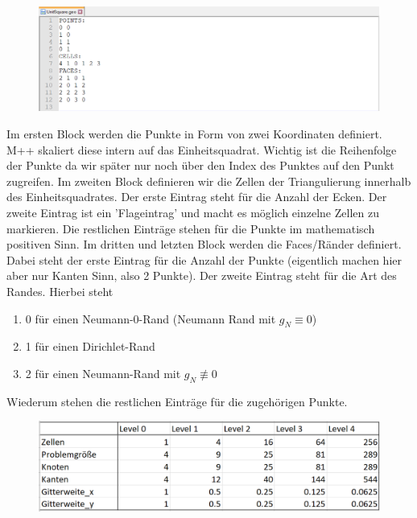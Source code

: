 \documentclass[12pt,a4paper]{scrartcl}
\numberwithin{equation}{section}
\begin{document}
\begin{enumerate}[label=(\roman*)]
\begin{figure}[H]
	\centering
		 \includegraphics[width=\textwidth]{../Geobeispiel.png}
\end{figure}
Im ersten Block werden die Punkte in Form von zwei Koordinaten definiert. M++ skaliert diese intern auf das Einheitsquadrat. Wichtig ist die Reihenfolge der Punkte da wir später nur noch über den Index des Punktes auf den Punkt zugreifen. \newline
Im zweiten Block definieren wir die Zellen der Triangulierung innerhalb des Einheitsquadrates.
Der erste Eintrag steht für die Anzahl der Ecken. Der zweite Eintrag ist ein 'Flageintrag' und macht es möglich einzelne Zellen zu markieren. 
Die restlichen Einträge stehen für die Punkte im mathematisch positiven Sinn. 
Im dritten und letzten Block werden die Faces/Ränder definiert. Dabei steht der erste Eintrag für die Anzahl der Punkte (eigentlich machen hier aber nur Kanten Sinn, also 2 Punkte). Der zweite Eintrag steht für die Art des Randes. Hierbei steht 
\begin{enumerate}
\item 0 für einen Neumann-0-Rand (Neumann Rand mit $g_N \equiv 0$) 
\item 1 für einen Dirichlet-Rand
\item 2 für einen Neumann-Rand mit $g_N \not\equiv 0$
\end{enumerate}
Wiederum stehen die restlichen Einträge für die zugehörigen Punkte. \newline
\par
\begin{figure}[H]
	\centering
	\includegraphics[width=\textwidth]{../Gitterverfeinerung2.png} 

\end{figure}
\end{enumerate}
\end{document}
